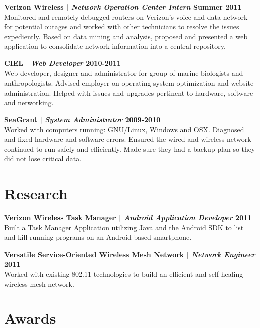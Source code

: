 \documentclass[margin,line]{res}
\begin{document}
\begin{resume}
{\bf Verizon Wireless | {\em Network Operation Center Intern} \hfill {\bf Summer 2011 \\} }
\vspace{-.01cm}
Monitored and remotely debugged routers on Verizon's voice and data network for potential outages and worked with other technicians to resolve the issues expediently.  Based on data mining and analysis, proposed and presented a web application to consolidate network information into a central repository.

{\bf CIEL | {\em Web Developer} \hfill {\bf 2010-2011 \\} }
\vspace{-.01cm}
Web developer, designer and administrator for group of marine biologists and anthropologists. Advised employer on operating system optimization and website administration. Helped with issues and upgrades pertinent to hardware, software and networking.

{\bf SeaGrant | {\em System Administrator} \hfill {\bf 2009-2010 \\} }
\vspace{-.01cm}
Worked with computers running: GNU/Linux, Windows and OSX. Diagnosed and fixed hardware and software errors. Ensured the wired and wireless network continued to run safely and efficiently. Made sure they had a backup plan so they did not lose critical data.

\section{\sc Research}

{\bf Verizon Wireless Task Manager | {\em Android Application Developer} \hfill {\bf 2011 \\} }
\vspace{-.01cm}
Built a Task Manager Application utilizing Java and the Android SDK to list and kill running programs on an Android-based smartphone. 

{\bf Versatile Service-Oriented Wireless Mesh Network | {\em Network Engineer} \hfill {\bf 2011 \\} }
\vspace{-.01cm}
Worked with existing 802.11 technologies to build an efficient and self-healing wireless mesh network. 

\section{\sc Awards}


\end{resume}
\end{document}
